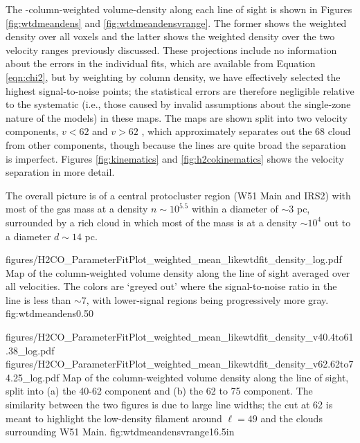The \ortho-column-weighted volume-density along each line of sight is shown in
Figures \ref{fig:wtdmeandens} and \ref{fig:wtdmeandensvrange}.  The former
shows the weighted density over all voxels and the latter shows the weighted
density over the two velocity ranges previously discussed.  These projections
include no information about the errors in the individual fits, which are
available from Equation \ref{eqn:chi2}, but by weighting by column density, we
have effectively selected the highest signal-to-noise points; the statistical
errors are therefore negligible relative to the systematic (i.e., those caused
by invalid assumptions about the single-zone nature of the models) in these
maps.  The maps are shown split into two velocity components,
$v<62$ \kms and $v>62$ \kms, which approximately separates out the 68 \kms
cloud from other components, though because the lines are quite broad the
separation is imperfect.  Figures \ref{fig:kinematics} and
\ref{fig:h2cokinematics} shows the velocity
separation in more detail.



The overall picture is of a central protocluster region (W51 Main and IRS2)
with most of the gas mass at a density $n\sim10^{5.5}$ \percc within a diameter
of $\sim3$ pc, surrounded by a rich cloud in which most of the mass is at a
density $\sim10^4$ \percc out to a diameter $d\sim14$ pc.


\Figure
{figures/H2CO_ParameterFitPlot_weighted_mean_likewtdfit_density_log.pdf}
{Map of the column-weighted volume density along the line of sight averaged
over all velocities.  The colors are `greyed out' where the
signal-to-noise ratio in the \oneone line is less than $\sim7$, with
lower-signal regions being progressively more gray.}
{fig:wtdmeandens}{0.5}{0}

\FigureTwoAA
{figures/H2CO_ParameterFitPlot_weighted_mean_likewtdfit_density_v40.4to61.38_log.pdf}
{figures/H2CO_ParameterFitPlot_weighted_mean_likewtdfit_density_v62.62to74.25_log.pdf}
{Map of the column-weighted volume density along the line of sight, split into 
(a) the 40-62 \kms component and (b) the 62 to 75 \kms component.  The
similarity between the two figures is due to large line widths; the cut at 62 \kms
is meant to highlight the low-density filament around $\ell=49$ and the clouds
surrounding W51 Main.}
{fig:wtdmeandensvrange}{1}{6.5in}

